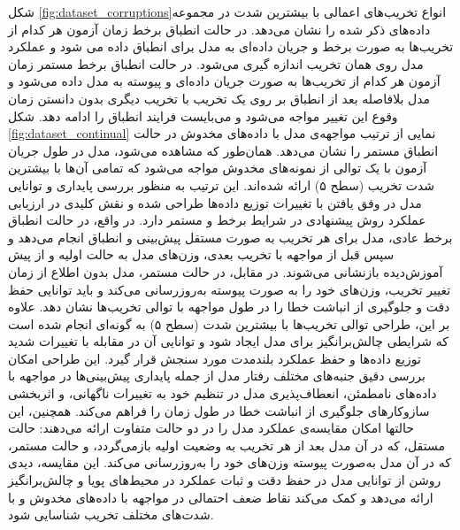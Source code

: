 شکل \ref{fig:dataset_corruptions}انواع تخریب‌های اعمالی با بیشترین شدت در مجموعه داده‌های ذکر شده را نشان می‌دهد. در حالت انطباق برخط زمان آزمون هر کدام از تخریب‌ها به صورت برخط و جریان داده‌ای به مدل برای انطباق داده می شود و عملکرد مدل روی همان تخریب اندازه گیری می‌شود. در حالت انطباق برخط مستمر زمان آزمون هر کدام از تخریب‌ها به صورت جریان داده‌ای و پیوسته به مدل داده می‌شود و مدل بلافاصله بعد از انطباق بر روی یک تخریب با تخریب دیگری بدون دانستن زمان وقوع این تغییر مواجه می‌شود و می‌بایست فرایند انطباق را ادامه دهد. شکل \ref{fig:dataset_continual} نمایی از ترتیب مواجهه‌ی مدل با داده‌های مخدوش در حالت انطباق مستمر را نشان می‌دهد. همان‌طور که مشاهده می‌شود، مدل در طول جریان آزمون با یک توالی از نمونه‌های مخدوش مواجه می‌شود که تمامی آن‌ها با بیشترین شدت تخریب (سطح ۵) ارائه شده‌اند. این ترتیب به منظور بررسی پایداری و توانایی مدل در وفق یافتن با تغییرات توزیع داده‌ها طراحی شده و نقش کلیدی در ارزیابی عملکرد روش پیشنهادی در شرایط برخط و مستمر دارد. در واقع، در حالت انطباق برخط عادی، مدل برای هر تخریب به صورت مستقل پیش‌بینی و انطباق انجام می‌دهد و سپس قبل از مواجهه با تخریب بعدی، وزن‌های مدل به حالت اولیه و از پیش آموزش‌دیده بازنشانی می‌شوند. در مقابل، در حالت مستمر، مدل بدون اطلاع از زمان تغییر تخریب، وزن‌های خود را به صورت پیوسته به‌روزرسانی می‌کند و باید توانایی حفظ دقت و جلوگیری از انباشت خطا را در طول مواجهه با توالی تخریب‌ها نشان دهد.
علاوه بر این، طراحی توالی تخریب‌ها با بیشترین شدت (سطح ۵) به گونه‌ای انجام شده است که شرایطی چالش‌برانگیز برای مدل ایجاد شود و توانایی آن در مقابله با تغییرات شدید توزیع داده‌ها و حفظ عملکرد بلندمدت مورد سنجش قرار گیرد. این طراحی امکان بررسی دقیق جنبه‌های مختلف رفتار مدل از جمله پایداری پیش‌بینی‌ها در مواجهه با داده‌های نامطمئن، انعطاف‌پذیری مدل در تنظیم خود به تغییرات ناگهانی، و اثربخشی سازوکار‌های جلوگیری از انباشت خطا در طول زمان را فراهم می‌کند.
همچنین، این حالتها امکان مقایسه‌ی عملکرد مدل را در دو حالت متفاوت ارائه می‌دهند: حالت مستقل، که در آن مدل بعد از هر تخریب به وضعیت اولیه بازمی‌گردد، و حالت مستمر، که در آن مدل به‌صورت پیوسته وزن‌های خود را به‌روزرسانی می‌کند. این مقایسه، دیدی روشن از توانایی مدل در حفظ دقت و ثبات عملکرد در محیط‌های پویا و چالش‌برانگیز ارائه می‌دهد و کمک می‌کند نقاط ضعف احتمالی در مواجهه با داده‌های مخدوش و با شدت‌های مختلف تخریب شناسایی شود.


